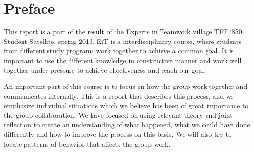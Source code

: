 \section*{Preface}

This report is a part of the result of the Experts in Teamwork village TFE4850 Student Satellite, spring 2013. EiT is a interdisciplinary course, where students from different study programs work together to achieve a common goal. It is important to use the different knowledge in constructive manner and work well together under pressure to achieve effectiveness and reach our goal. 

An important part of this course is to focus on how the group work together and communicates internally. This is a report that describes this process, and we emphasize individual situations which we believe has been of great importance to the group collaboration. We have focused on using relevant theory and joint reflection to create an understanding of what happened,  what we could have done differently and how to improve the process on this basis. We will also try to locate patterns of behavior that affects the group work. 





